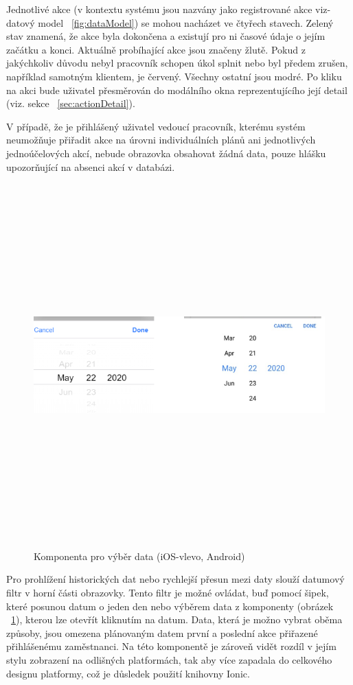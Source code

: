 \documentclass[
  glossaries,
]{kidiplom}
\begin{document}
Jednotlivé akce (v kontextu systému jsou nazvány jako registrované akce viz-datový model ~\ref{fig:dataModel}) se mohou nacházet ve čtyřech stavech. Zelený stav znamená, že akce byla dokončena a existují pro ni časové údaje o jejím začátku a konci. Aktuálně probíhající akce jsou značeny žlutě. Pokud z jakýchkoliv důvodu nebyl pracovník schopen úkol splnit nebo byl předem zrušen, například samotným klientem, je červený. Všechny ostatní jsou modré. Po kliku na akci bude uživatel přesměrován do modálního okna reprezentujícího její detail (viz. sekce ~\ref{sec:actionDetail}).

V případě, že je přihlášený uživatel vedoucí pracovník, kterému systém neumožňuje přiřadit akce na úrovni individuálních plánů ani jednotlivých jednoúčelových akcí, nebude obrazovka obsahovat žádná data, pouze hlášku upozorňující na absenci akcí v databázi.

\begin{figure}[H]
  	\centering
 	 \includegraphics[width=14cm,height=14cm,keepaspectratio]{datepicker}
 	 \caption{Komponenta pro výběr data (iOS-vlevo, Android)}
 	 \label{fig:datepicker}
\end{figure}

Pro prohlížení historických dat nebo rychlejší přesun mezi daty slouží datumový filtr v horní části obrazovky. Tento filtr je možné ovládat, buď pomocí šipek, které posunou datum o jeden den nebo výběrem data z komponenty (obrázek ~\ref{fig:datepicker}), kterou lze otevřít kliknutím na datum. Data, která je možno vybrat oběma způsoby, jsou omezena plánovaným datem první a poslední akce přiřazené přihlášenému zaměstnanci. Na této komponentě je zároveň vidět rozdíl v jejím stylu zobrazení na odlišných platformách, tak aby více zapadala do celkového designu platformy, což je důsledek použití knihovny Ionic.
\end{document}
